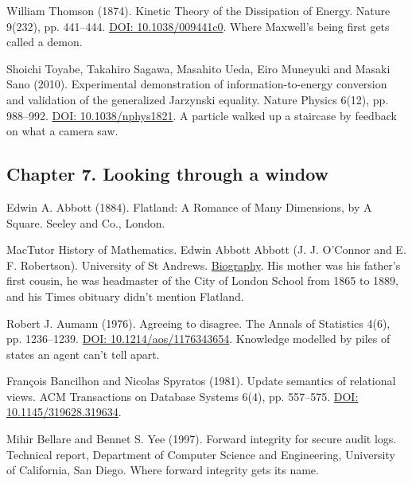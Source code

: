 \noindent William Thomson (1874). Kinetic Theory of the Dissipation of Energy. Nature 9(232), pp. 441--444. \href{https://doi.org/10.1038/009441c0}{DOI: 10.1038/009441c0}. Where Maxwell's being first gets called a demon.
\par\medskip

\noindent Shoichi Toyabe, Takahiro Sagawa, Masahito Ueda, Eiro Muneyuki and Masaki Sano (2010). Experimental demonstration of information-to-energy conversion and validation of the generalized Jarzynski equality. Nature Physics 6(12), pp. 988--992. \href{https://doi.org/10.1038/nphys1821}{DOI: 10.1038/nphys1821}. A particle walked up a staircase by feedback on what a camera saw.
\par\medskip

\subsection*{Chapter 7. Looking through a window}

\noindent Edwin A. Abbott (1884). Flatland: A Romance of Many Dimensions, by A Square. Seeley and Co., London.
\par\medskip

\noindent MacTutor History of Mathematics. Edwin Abbott Abbott (J. J. O'Connor and E. F. Robertson). University of St Andrews. \href{https://mathshistory.st-andrews.ac.uk/Biographies/Abbott/}{Biography}. His mother was his father's first cousin, he was headmaster of the City of London School from 1865 to 1889, and his Times obituary didn't mention Flatland.
\par\medskip

\noindent Robert J. Aumann (1976). Agreeing to disagree. The Annals of Statistics 4(6), pp. 1236--1239. \href{https://doi.org/10.1214/aos/1176343654}{DOI: 10.1214/aos/1176343654}. Knowledge modelled by piles of states an agent can't tell apart.
\par\medskip

\noindent Fran\c{c}ois Bancilhon and Nicolas Spyratos (1981). Update semantics of relational views. ACM Transactions on Database Systems 6(4), pp. 557--575. \href{https://doi.org/10.1145/319628.319634}{DOI: 10.1145/319628.319634}.
\par\medskip

\noindent Mihir Bellare and Bennet S. Yee (1997). Forward integrity for secure audit logs. Technical report, Department of Computer Science and Engineering, University of California, San Diego. Where forward integrity gets its name.
\par\medskip

